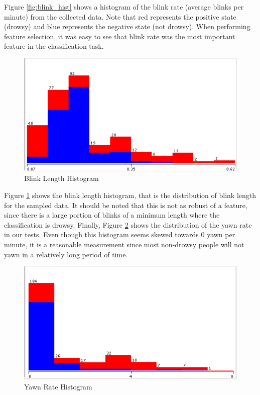 \documentclass[twocolumn]{article}
\begin{document}
Figure \ref{fig:blink_hist} shows a histogram of the blink rate (average blinks per minute) from the collected data. Note that red represents the positive state (drowsy) and blue represents the negative state (not drowsy). When performing feature selection, it was easy to see that blink rate was the most important feature in the classification task. 

\begin{figure}[H]
\centering
\includegraphics[width=0.8\linewidth]{./blink_length.png}
\caption{Blink Length Histogram }
\label{fig:blink_length_hist}
\end{figure}


Figure \ref{fig:blink_length_hist} shows the blink length histogram, that is the distribution of blink length for the sampled data. It should be noted that this is not as robust of a feature, since there is a large portion of blinks of a minimum length where the classification is drowsy. Finally, Figure \ref{fig:yawn_hist} shows the distribution of the yawn rate in our tests. Even though this histogram seems skewed towards 0 yawn per minute, it is a reasonable measurement since most non-drowsy people will not yawn in a relatively long period of time. 

\begin{figure}[H]
\centering
\includegraphics[width=0.8\linewidth]{./yawn_rate.png}
\caption{Yawn Rate Histogram }
\label{fig:yawn_hist}
\end{figure}
\end{document}
